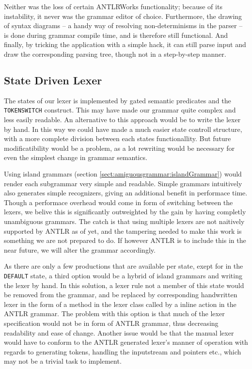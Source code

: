 Neither was the loss of certain ANTLRWorks functionality; because of its instability, it never was the grammar editor of choice. Furthermore, the drawing of syntax diagrams -- a handy way of resolving non-determinisms in the parser -- is done during grammar compile time, and is therefore still functional. And finally, by tricking the application with a simple hack, it can still parse input and draw the corresponding parsing tree, though not in a step-by-step manner.

\subsection{State Driven Lexer}
\label{sect:discussion:stateDriven}

The states of our lexer is implemented by gated semantic predicates and the \verb!TOKENSWITCH! construct. This may have made our grammar quite complex and less easily readable. An alternative to this approach would be to write the lexer by hand. In this way we could have made a much easier state controll structure, with a more complete division between each states functionallity. But future modificatibility would be a problem, as a lot rewriting would be necessary for even the simplest change in grammar semantics.

Using island grammars (section \ref{sect:amiguousgrammar:islandGrammar}) would render each subgrammar very simple and readable. Simple grammars intuitively also generates simple recognizers, giving an additional benefit in performace time. Though a performace overhead would come in form of switching between the lexers, we belive this is significantly outweighted by the gain by having completly unambiguous grammars. The catch is that using multiple lexers are not naitively supported by ANTLR as of yet, and the tampering needed to make this work is something we are not prepared to do. If however ANTLR is to include this in the near future, we will alter the grammar accordingly.

As there are only a few productions that are available per state, exept for in the \verb!DEFAULT! state, a third option would be a hybrid of island grammars and writing the lexer by hand. In this solution, a lexer rule not a member of this state would be removed from the grammar, and be replaced by corresponding handwritten lexer in the form of a method in the lexer class called by a inline action in the ANTLR grammar. The problem with this option is that much of the lexer specification would not be in form of ANTLR grammar, thus decreasing readability and ease of change. Another issue would be that the manual lexer would have to conform to the ANTLR generated lexer's manner of operation with regards to generating tokens, handling the inputstream and pointers etc., which may not be a trivial task to implement.